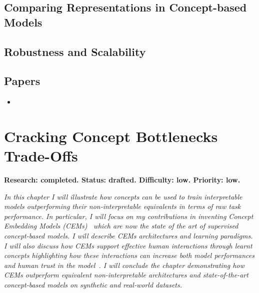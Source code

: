 \documentclass[withindex,glossary]{cam-thesis}
\theoremstyle{plain}
\theoremstyle{definition}
\theoremstyle{remark}
\begin{document}
\section{Comparing Representations in Concept-based Models}

\section{Robustness and Scalability}

\section*{Papers}
\nobibliography*
\begin{itemize}
    \item {}
\end{itemize}



\chapter{Cracking Concept Bottlenecks Trade-Offs} \label{chapter:cem}
\textbf{Research: completed. Status: drafted. Difficulty: low. Priority: low.}

\textit{In this chapter I will illustrate how concepts can be used to train interpretable models outperforming their non-interpretable equivalents in terms of raw task performance. In particular, I will focus on my contributions in inventing Concept Embedding Models (CEMs)~\citep{zarlenga2022concept} which are now the state of the art of supervised concept-based models. I will describe CEMs architectures and learning paradigms. I will also discuss how CEMs support effective human interactions through learnt concepts highlighting how these interactions can increase both model performances and human trust in the model~\citep{shen2022trust}. I will conclude the chapter demonstrating how CEMs outperform equivalent non-interpretable architectures and state-of-the-art concept-based models on synthetic and real-world datasets.}
\end{document}
